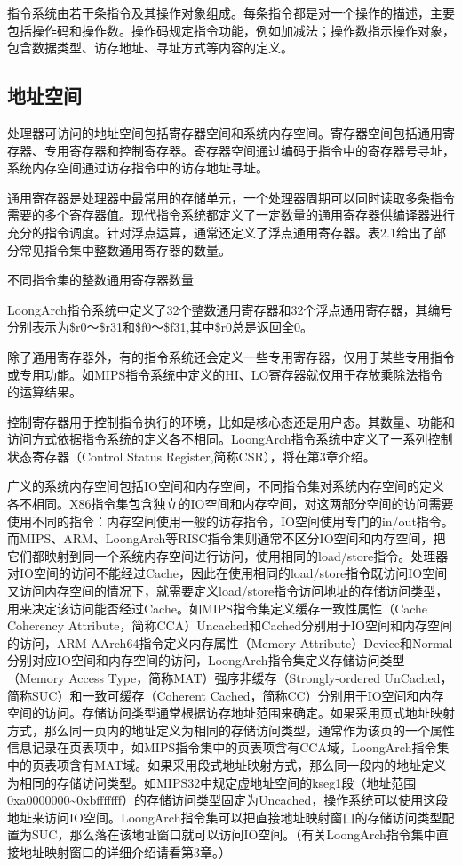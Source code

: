 \documentclass[]{ctexbook}
\begin{document}
指令系统由若干条指令及其操作对象组成。每条指令都是对一个操作的描述，主要包括操作码和操作数。操作码规定指令功能，例如加减法；操作数指示操作对象，包含数据类型、访存地址、寻址方式等内容的定义。

\hypertarget{ux5730ux5740ux7a7aux95f4}{%
\subsection{地址空间}\label{ux5730ux5740ux7a7aux95f4}}

处理器可访问的地址空间包括寄存器空间和系统内存空间。寄存器空间包括通用寄存器、专用寄存器和控制寄存器。寄存器空间通过编码于指令中的寄存器号寻址，系统内存空间通过访存指令中的访存地址寻址。

通用寄存器是处理器中最常用的存储单元，一个处理器周期可以同时读取多条指令需要的多个寄存器值。现代指令系统都定义了一定数量的通用寄存器供编译器进行充分的指令调度。针对浮点运算，通常还定义了浮点通用寄存器。表2.1给出了部分常见指令集中整数通用寄存器的数量。

\label{tab:regnum}不同指令集的整数通用寄存器数量

LoongArch指令系统中定义了32个整数通用寄存器和32个浮点通用寄存器，其编号分别表示为\$r0～\$r31和\$f0～\$f31,其中\$r0总是返回全0。

除了通用寄存器外，有的指令系统还会定义一些专用寄存器，仅用于某些专用指令或专用功能。如MIPS指令系统中定义的HI、LO寄存器就仅用于存放乘除法指令的运算结果。

控制寄存器用于控制指令执行的环境，比如是核心态还是用户态。其数量、功能和访问方式依据指令系统的定义各不相同。LoongArch指令系统中定义了一系列控制状态寄存器（Control Status Register,简称CSR），将在第3章介绍。

广义的系统内存空间包括IO空间和内存空间，不同指令集对系统内存空间的定义各不相同。X86指令集包含独立的IO空间和内存空间，对这两部分空间的访问需要使用不同的指令：内存空间使用一般的访存指令，IO空间使用专门的in/out指令。而MIPS、ARM、LoongArch等RISC指令集则通常不区分IO空间和内存空间，把它们都映射到同一个系统内存空间进行访问，使用相同的load/store指令。处理器对IO空间的访问不能经过Cache，因此在使用相同的load/store指令既访问IO空间又访问内存空间的情况下，就需要定义load/store指令访问地址的存储访问类型，用来决定该访问能否经过Cache。如MIPS指令集定义缓存一致性属性（Cache Coherency Attribute，简称CCA）Uncached和Cached分别用于IO空间和内存空间的访问，ARM AArch64指令定义内存属性（Memory Attribute）Device和Normal分别对应IO空间和内存空间的访问，LoongArch指令集定义存储访问类型（Memory Access Type，简称MAT）强序非缓存（Strongly-ordered UnCached，简称SUC）和一致可缓存（Coherent Cached，简称CC）分别用于IO空间和内存空间的访问。存储访问类型通常根据访存地址范围来确定。如果采用页式地址映射方式，那么同一页内的地址定义为相同的存储访问类型，通常作为该页的一个属性信息记录在页表项中，如MIPS指令集中的页表项含有CCA域，LoongArch指令集中的页表项含有MAT域。如果采用段式地址映射方式，那么同一段内的地址定义为相同的存储访问类型。如MIPS32中规定虚地址空间的kseg1段（地址范围0xa0000000\textasciitilde0xbfffffff）的存储访问类型固定为Uncached，操作系统可以使用这段地址来访问IO空间。LoongArch指令集可以把直接地址映射窗口的存储访问类型配置为SUC，那么落在该地址窗口就可以访问IO空间。（有关LoongArch指令集中直接地址映射窗口的详细介绍请看第3章。）
\end{document}
